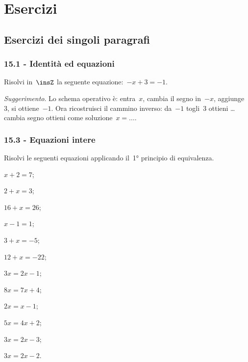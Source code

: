 
\section{Esercizi}
\subsection{Esercizi dei singoli paragrafi}
\subsubsection*{15.1 - Identità ed equazioni}

\begin{esercizio}
\label{ese:15.1}
Risolvi in~$\insZ$ la seguente equazione:~$-x+3=-1$.

\emph{Suggerimento}. Lo schema operativo è: entra~$x$, cambia il segno in~$-x$, aggiunge~$3$, si ottiene~$-1$.
Ora ricostruisci il cammino inverso: da~$-1$ togli~$3$ ottieni \ldots cambia segno ottieni come soluzione~$x = \ldots$.
\end{esercizio}

\subsubsection*{15.3 - Equazioni intere}

\begin{esercizio}[\Ast]
\label{ese:15.2}
Risolvi le seguenti equazioni applicando il~1° principio di equivalenza.
\begin{multicols}{3}
\begin{enumeratea}
 \item $x+2=7$;
 \item $2+x=3$;
 \item $16+x=26$;
 \item $x-1=1$;
 \item $3+x=-5$;
 \item $12+x=-22$;
 \item $3x=2x-1$;
 \item $8x=7x+4$;
 \item $2x=x-1$;
 \item $5x=4x+2$;
 \item $3x=2x-3$;
 \item $3x=2x-2$.
\end{enumeratea}
\end{multicols}
\end{esercizio}

